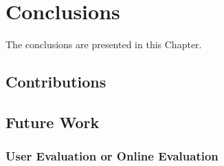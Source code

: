 \chapter{Conclusions}\label{C:con}
The conclusions are presented in this Chapter.

\section{Contributions}

\section{Future Work}

\subsection{User Evaluation or Online Evaluation}
